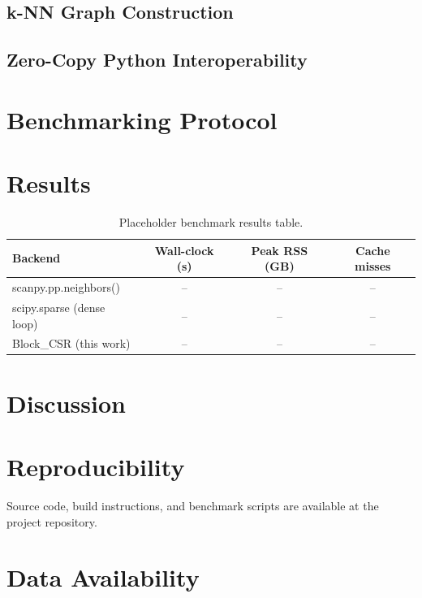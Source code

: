 \documentclass[11pt]{article}
\begin{document}
\subsection{k-NN Graph Construction}

\subsection{Zero-Copy Python Interoperability}

\section{Benchmarking Protocol}

\section{Results}

\begin{table}[h]
\centering
\caption{Placeholder benchmark results table.}
\begin{tabular}{lccc}
\toprule
Backend & Wall-clock (s) & Peak RSS (GB) & Cache misses \\
\midrule
scanpy.pp.neighbors() & -- & -- & -- \\
scipy.sparse (dense loop) & -- & -- & -- \\
Block\_CSR (this work) & -- & -- & -- \\
\bottomrule
\end{tabular}
\end{table}

\section{Discussion}

\section{Reproducibility}
Source code, build instructions, and benchmark scripts are available at the
project repository. %

\section*{Data Availability}



\end{document}
